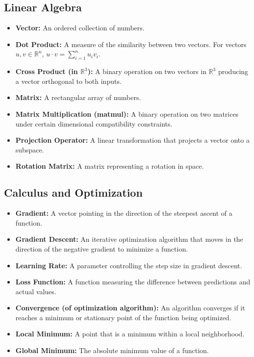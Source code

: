 \documentclass[12pt, a4paper]{article}
\begin{document}
\subsection{Linear Algebra}

\begin{itemize}
    \item \textbf{Vector:} An ordered collection of numbers.
    \item \textbf{Dot Product:}  A measure of the similarity between two vectors.  For vectors $u, v \in \mathbb{R}^n$,  $u \cdot v = \sum_{i=1}^n u_i v_i$.
    \item \textbf{Cross Product (in $\mathbb{R}^3$): } A binary operation on two vectors in $\mathbb{R}^3$ producing a vector orthogonal to both inputs.
    \item \textbf{Matrix:} A rectangular array of numbers.
    \item \textbf{Matrix Multiplication (matmul): } A binary operation on two matrices under certain dimensional compatibility constraints.
    \item \textbf{Projection Operator:} A linear transformation that projects a vector onto a subspace.
    \item \textbf{Rotation Matrix:} A matrix representing a rotation in space.
\end{itemize}

\subsection{Calculus and Optimization}

\begin{itemize}
    \item \textbf{Gradient:} A vector pointing in the direction of the steepest ascent of a function.
    \item \textbf{Gradient Descent:} An iterative optimization algorithm that moves in the direction of the negative gradient to minimize a function.
    \item \textbf{Learning Rate:} A parameter controlling the step size in gradient descent.
    \item \textbf{Loss Function:} A function measuring the difference between predictions and actual values.
    \item \textbf{Convergence (of optimization algorithm): }  An algorithm converges if it reaches a minimum or stationary point of the function being optimized.
    \item \textbf{Local Minimum:} A point that is a minimum within a local neighborhood.
    \item \textbf{Global Minimum:} The absolute minimum value of a function.
\end{itemize}
\end{document}
